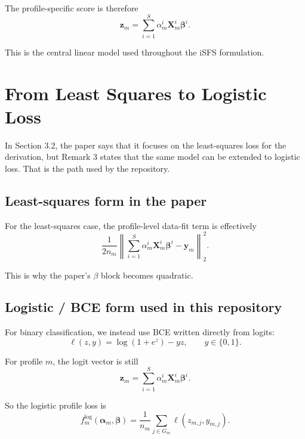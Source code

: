 \documentclass[11pt]{article}
\newcommand{\Xm}{\mathbf{X}_m}
\newcommand{\ym}{\mathbf{y}_m}
\newcommand{\zm}{\mathbf{z}_m}
\newcommand{\alpham}{\boldsymbol{\alpha}_m}
\newcommand{\betai}{\boldsymbol{\beta}^i}
\newcommand{\betavec}{\boldsymbol{\beta}}
\begin{document}
The profile-specific score is therefore
\begin{equation}
\label{eq:profile-score}
\zm
=
\sum_{i=1}^{S} \alpha_m^i \Xm^i \betai.
\end{equation}

This is the central linear model used throughout the iSFS formulation.

\section{From Least Squares to Logistic Loss}

In Section 3.2, the paper says that it focuses on the least-squares loss for
the derivation, but Remark 3 states that the same model can be extended to
logistic loss. That is the path used by the repository.

\subsection{Least-squares form in the paper}

For the least-squares case, the profile-level data-fit term is effectively
\begin{equation}
\label{eq:least-squares-profile}
\frac{1}{2n_m}
\left\|
\sum_{i=1}^{S} \alpha_m^i \Xm^i \betai
- \ym
\right\|_2^2.
\end{equation}

This is why the paper's $\beta$ block becomes quadratic.

\subsection{Logistic / BCE form used in this repository}

For binary classification, we instead use BCE written directly from logits:
\begin{equation}
\label{eq:bce-pointwise}
\ell(z, y)
=
\log(1 + e^z) - yz,
\qquad y \in \{0,1\}.
\end{equation}

For profile $m$, the logit vector is still
\begin{equation}
\label{eq:logit-vector-profile}
\zm
=
\sum_{i=1}^{S} \alpha_m^i \Xm^i \betai.
\end{equation}

So the logistic profile loss is
\begin{equation}
\label{eq:logistic-profile-loss}
f_m^{\mathrm{log}}(\alpham, \betavec)
=
\frac{1}{n_m}
\sum_{j \in G_m}
\ell(z_{m,j}, y_{m,j}).
\end{equation}
\end{document}
